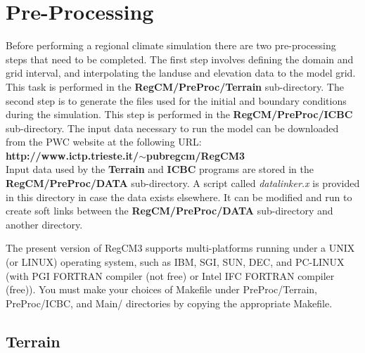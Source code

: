 \newpage
\section{Pre-Processing}
Before performing a regional climate simulation there are two pre-processing steps that need to be completed.  The first step involves defining the domain and grid interval, and interpolating the landuse and elevation data to the model grid.  This task is performed in the {\bf RegCM/PreProc/Terrain} sub-directory. The second step is to generate the files used for the initial and boundary conditions during the simulation. This step is performed in the {\bf RegCM/PreProc/ICBC} sub-directory.  The input data necessary to run the model can be downloaded from the PWC 
website at the following URL: \\

{\bf http://www.ictp.trieste.it/$\sim$pubregcm/RegCM3} \\

Input data used by the {\bf Terrain} and {\bf ICBC}  programs are 
stored in the {\bf RegCM/PreProc/DATA} sub-directory.  A script called
{\it datalinker.x} is provided in this directory in case the data 
exists elsewhere.  It can be modified and run to create soft links 
between the {\bf RegCM/PreProc/DATA} sub-directory and another directory.

The present version of RegCM3 supports multi-platforms running under a UNIX (or LINUX) operating
system, such as IBM, SGI, SUN, DEC, and PC-LINUX (with PGI FORTRAN compiler (not free) or
Intel IFC FORTRAN compiler (free)). You must make your choices of Makefile under 
PreProc/Terrain, PreProc/ICBC, and Main/ directories by copying the appropriate
Makefile. 

\subsection{Terrain}

